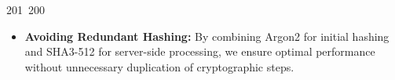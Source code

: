 201~200~\documentclass{article}
\begin{document}
	                                                                                                                                                                                                                                                                                                	                                                                                                                                        	    	                                                                                                	                                                                                                                                                                                                                                                                                                                                	                                                                        	                                                                        	                                                                                                                                        	                                                                                                                        \begin{itemize}
	                                                                                                                                                                                                                                                                                                	                                                                                                                                        	    	                                                                                                	                                                                                                                                                                                                                                                                                                                                	                                                                        	                                                                        	                                                                                                                                        	                                                                                                                            \item \textbf{Avoiding Redundant Hashing:} By combining Argon2 for initial hashing and SHA3-512 for server-side processing, we ensure optimal performance without unnecessary duplication of cryptographic steps.

\end{itemize}
\end{document}
